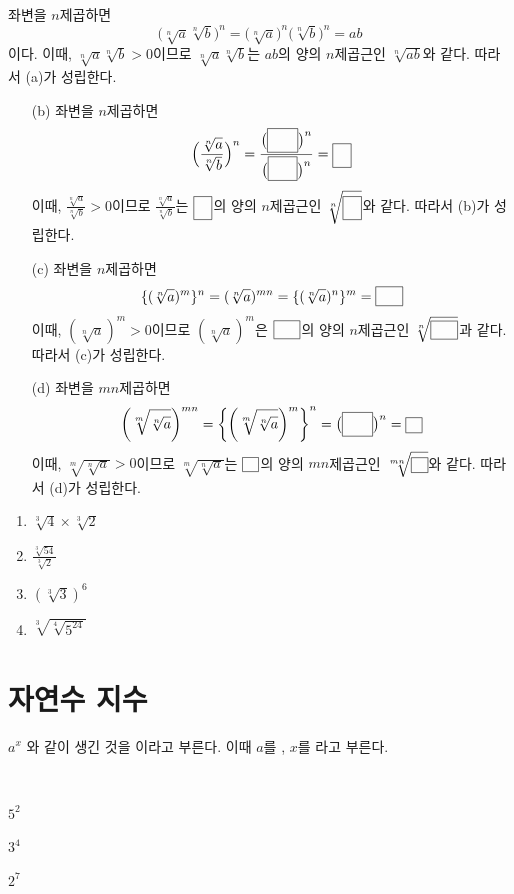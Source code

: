 \documentclass{oblivoir}
\begin{document}
%
\label{property3}
좌변을 \(n\)제곱하면
\[\big(\sqrt[n]a\sqrt[n]b\big)^n=\big(\sqrt[n]a\big)^n\big(\sqrt[n]b\big)^n=ab\]
이다.
이때, \(\sqrt[n]a\sqrt[n]b>0\)이므로
\(\sqrt[n]a\sqrt[n]b\)는 \(ab\)의 양의 \(n\)제곱근인 \(\sqrt[n]{ab}\)와 같다.
따라서 (a)가 성립한다.

%
\label{property4}
\begin{mdframed}
\begin{enumerate}
\item[(b)]
좌변을 \(n\)제곱하면
\[\Big(\frac{\sqrt[n]a}{\sqrt[n]b}\Big)^n=\frac{\big(\pb{\sqrt[n]a}\big)^n}{\big(\pb{\sqrt[n]b}\big)^n}=\pb{\frac ab}\]
이때, \(\frac{\sqrt[n]a}{\sqrt[n]b}>0\)이므로
\(\frac{\sqrt[n]a}{\sqrt[n]b}\)는 \(\pb{\frac ab}\)의 양의 \(n\)제곱근인 \(\sqrt[n]{\pb{\frac ab}}\)와 같다.
따라서 (b)가 성립한다.
\item[(c)]
좌변을 \(n\)제곱하면
\[\{(\sqrt[n]a)^m\}^n=(\sqrt[n]a)^{mn}=\{(\sqrt[n]a)^n\}^m=\pb{a^m}\]
이때, \((\sqrt[n]a)^m>0\)이므로 \((\sqrt[n]a)^m\)은 \(\pb{a^m}\)의 양의 \(n\)제곱근인 \(\sqrt[n]{\pb{a^m}}\)과 같다.
따라서 (c)가 성립한다.
\item[(d)]
좌변을 \(mn\)제곱하면
\[\left(\sqrt[m]{\sqrt[n]a}\right)^{mn}
=\left\{\left(\sqrt[m]{\sqrt[n]a}\right)^m\right\}^n
=\big(\pb{\sqrt[n]a}\big)^n
=\pb a
\]
이때, \(\sqrt[m]{\sqrt[n]a}>0\)이므로 \(\sqrt[m]{\sqrt[n]a}\)는 \(\pb a\)의 양의 \(mn\)제곱근인 \(\sqrt[mn]{\pb a}\)와 같다.
따라서 (d)가 성립한다.
\end{enumerate}
\end{mdframed}

%
\begin{enumerate}\label{property5}
\item
\(\sqrt[3]4\times\sqrt[3]2\)
\item
\(\displaystyle\frac{\sqrt[3]{54}}{\sqrt[3]2}\)
\item
\(\left(\sqrt[3]3\right)^6\)
\item
\(\sqrt[3]{\sqrt[4]{5^{24}}}\)
\end{enumerate}

\section{자연수 지수}
\(a^x\)
와 같이 생긴 것을 이라고 부른다.
이때 \(a\)를 , \(x\)를 라고 부른다.

%
\label{natural1}
\\[-10pt]
\begin{enumerate*}[itemjoin=\hspace{0.25\textwidth}]
\item
\(5^2\)
\item
\(3^4\)
\item
\(2^7\)
\end{enumerate*}
\end{document}

